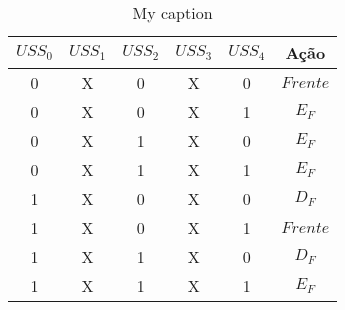 \begin{table}[!htb]
\centering
\caption{My caption}
\label{tabela-interf}
\begin{tabular}{|ccccc|c|}
\hline
{\color[HTML]{00009B} $USS_0$} & {\color[HTML]{00009B} $USS_1$} & {\color[HTML]{00009B} $USS_2$} & {\color[HTML]{00009B} $USS_3$} & 
{\color[HTML]{00009B} $USS_4$} & {\color[HTML]{FE0000} \textbf{Ação}} \\ \hline
{\color[HTML]{00009B} 0}      & {\color[HTML]{00009B} X}      & {\color[HTML]{00009B} 0}      & {\color[HTML]{00009B} X}      & {\color[HTML]{00009B} 
0}      & {\color[HTML]{FE0000} $Frente$}             \\ \hline
{\color[HTML]{00009B} 0}      & {\color[HTML]{00009B} X}      & {\color[HTML]{00009B} 0}      & {\color[HTML]{00009B} X}      & {\color[HTML]{00009B} 
1}      & {\color[HTML]{FE0000} $E_F$}             \\ \hline
{\color[HTML]{00009B} 0}      & {\color[HTML]{00009B} X}      & {\color[HTML]{00009B} 1}      & {\color[HTML]{00009B} X}      & {\color[HTML]{00009B} 
0}      & {\color[HTML]{FE0000} $E_F$}             \\ \hline
{\color[HTML]{00009B} 0}      & {\color[HTML]{00009B} X}      & {\color[HTML]{00009B} 1}      & {\color[HTML]{00009B} X}      & {\color[HTML]{00009B} 
1}      & {\color[HTML]{FE0000} $E_F$}             \\ \hline
{\color[HTML]{00009B} 1}      & {\color[HTML]{00009B} X}      & {\color[HTML]{00009B} 0}      & {\color[HTML]{00009B} X}      & {\color[HTML]{00009B} 
0}      & {\color[HTML]{FE0000} $D_F$}             \\ \hline
{\color[HTML]{00009B} 1}      & {\color[HTML]{00009B} X}      & {\color[HTML]{00009B} 0}      & {\color[HTML]{00009B} X}      & {\color[HTML]{00009B} 
1}      & {\color[HTML]{FE0000} $Frente$}             \\ \hline
{\color[HTML]{00009B} 1}      & {\color[HTML]{00009B} X}      & {\color[HTML]{00009B} 1}      & {\color[HTML]{00009B} X}      & {\color[HTML]{00009B} 
0}      & {\color[HTML]{FE0000} $D_F$}             \\ \hline
{\color[HTML]{00009B} 1}      & {\color[HTML]{00009B} X}      & {\color[HTML]{00009B} 1}      & {\color[HTML]{00009B} X}      & {\color[HTML]{00009B} 
1}      & {\color[HTML]{FE0000} $E_F$}             \\ \hline
\end{tabular}
\end{table}